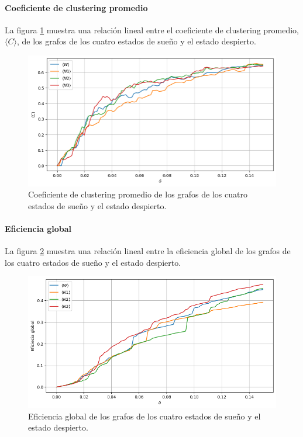 \documentclass{article}
\begin{document}
\paragraph*{Coeficiente de clustering promedio}

La figura \ref{fg:coeficienteClusteringPromedio} muestra una relación lineal entre el coeficiente de clustering promedio, $\langle C \rangle$, de los grafos de los cuatro estados de sueño y el estado despierto.

\begin{figure}[ht]
	\centering
	\includegraphics[width= 0.8\linewidth]{coeficienteClusteringPromedio.png}
	\caption{Coeficiente de clustering promedio de los grafos de los cuatro estados de sueño y el estado despierto.
	}
	\label{fg:coeficienteClusteringPromedio}
\end{figure}


\paragraph*{Eficiencia global}

La figura \ref{fg:eficienciaGlobal} muestra una relación lineal entre la eficiencia global de los grafos de los cuatro estados de sueño y el estado despierto.

\begin{figure}[ht]
	\centering
	\includegraphics[width= 0.8\linewidth]{eficienciaGlobal.png}
	\caption{Eficiencia global de los grafos de los cuatro estados de sueño y el estado despierto.
	}
	\label{fg:eficienciaGlobal}
\end{figure}
\end{document}
